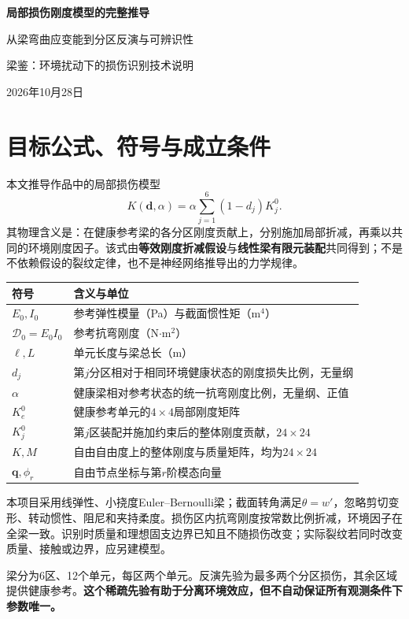 \documentclass[UTF8,a4paper,11pt,fontset=fandol]{ctexart}
\numberwithin{equation}{section}
\newcommand{\EI}{\mathcal D}
\begin{document}
\begin{center}
{\LARGE\bfseries\color{ink}局部损伤刚度模型的完整推导}\par\vspace{5pt}
{\large 从梁弯曲应变能到分区反演与可辨识性}\par\vspace{4pt}
梁鉴：环境扰动下的损伤识别\quad 技术说明\par
2026年10月28日
\end{center}
\section{目标公式、符号与成立条件}
本文推导作品中的局部损伤模型
\begin{equation}\boxed{K(\bm d,\alpha)=\alpha\sum_{j=1}^{6}(1-d_j)K_j^0.}\label{eq:target}\end{equation}
其物理含义是：在健康参考梁的各分区刚度贡献上，分别施加局部折减，再乘以共同的环境刚度因子。该式由\textbf{等效刚度折减假设}与\textbf{线性梁有限元装配}共同得到；不是不依赖假设的裂纹定律，也不是神经网络推导出的力学规律。
\begin{center}\small
\begin{tabular}{p{25mm}p{112mm}}\toprule
符号 & 含义与单位\\\midrule
$E_0,I_0$ & 参考弹性模量（Pa）与截面惯性矩（m$^4$）\\
$\EI_0=E_0I_0$ & 参考抗弯刚度（N$\cdot$m$^2$）\\
$\ell,L$ & 单元长度与梁总长（m）\\
$d_j$ & 第$j$分区相对于相同环境健康状态的刚度损失比例，无量纲\\
$\alpha$ & 健康梁相对参考状态的统一抗弯刚度比例，无量纲、正值\\
$K_e^0$ & 健康参考单元的$4\times4$局部刚度矩阵\\
$K_j^0$ & 第$j$区装配并施加约束后的整体刚度贡献，$24\times24$\\
$K,M$ & 自由自由度上的整体刚度与质量矩阵，均为$24\times24$\\
$\bm q,\phi_r$ & 自由节点坐标与第$r$阶模态向量\\\bottomrule
\end{tabular}\end{center}
本项目采用线弹性、小挠度Euler--Bernoulli梁；截面转角满足$\theta=w'$，忽略剪切变形、转动惯性、阻尼和夹持柔度。损伤区内抗弯刚度按常数比例折减，环境因子在全梁一致。识别时质量和理想固支边界已知且不随损伤改变；实际裂纹若同时改变质量、接触或边界，应另建模型。

梁分为6区、12个单元，每区两个单元。反演先验为最多两个分区损伤，其余区域提供健康参考。\textbf{这个稀疏先验有助于分离环境效应，但不自动保证所有观测条件下参数唯一。}
\end{document}

